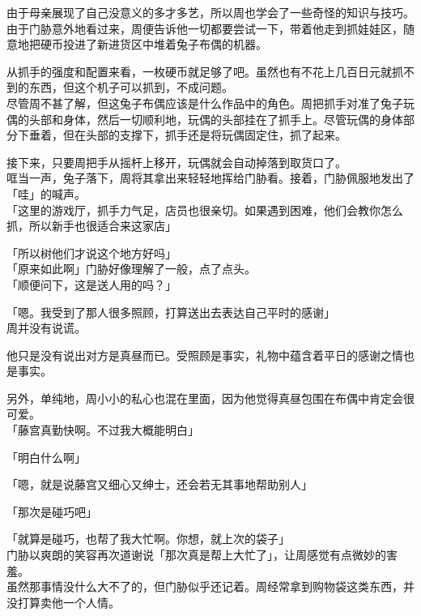 由于母亲展现了自己没意义的多才多艺，所以周也学会了一些奇怪的知识与技巧。\\

由于门胁意外地看过来，周便告诉他一切都要尝试一下，带着他走到抓娃娃区，随意地把硬币投进了新进货区中堆着兔子布偶的机器。

从抓手的强度和配置来看，一枚硬币就足够了吧。虽然也有不花上几百日元就抓不到的东西，但这个机子可以抓到，不成问题。\\

尽管周不甚了解，但这兔子布偶应该是什么作品中的角色。周把抓手对准了兔子玩偶的头部和身体，然后一切顺利地，玩偶的头部挂在了抓手上。尽管玩偶的身体部分下垂着，但在头部的支撑下，抓手还是将玩偶固定住，抓了起来。

接下来，只要周把手从摇杆上移开，玩偶就会自动掉落到取货口了。\\

哐当一声，兔子落下，周将其拿出来轻轻地挥给门胁看。接着，门胁佩服地发出了「哇」的喊声。\\

「这里的游戏厅，抓手力气足，店员也很亲切。如果遇到困难，他们会教你怎么抓，所以新手也很适合来这家店」

「所以树他们才说这个地方好吗」\\

「原来如此啊」门胁好像理解了一般，点了点头。\\

「顺便问下，这是送人用的吗？」

「嗯。我受到了那人很多照顾，打算送出去表达自己平时的感谢」\\

周并没有说谎。

他只是没有说出对方是真昼而已。受照顾是事实，礼物中蕴含着平日的感谢之情也是事实。

另外，单纯地，周小小的私心也混在里面，因为他觉得真昼包围在布偶中肯定会很可爱。\\

「藤宫真勤快啊。不过我大概能明白」

「明白什么啊」

「嗯，就是说藤宫又细心又绅士，还会若无其事地帮助别人」

「那次是碰巧吧」

「就算是碰巧，也帮了我大忙啊。你想，就上次的袋子」\\

门胁以爽朗的笑容再次道谢说「那次真是帮上大忙了」，让周感觉有点微妙的害羞。\\

虽然那事情没什么大不了的，但门胁似乎还记着。周经常拿到购物袋这类东西，并没打算卖他一个人情。\\

